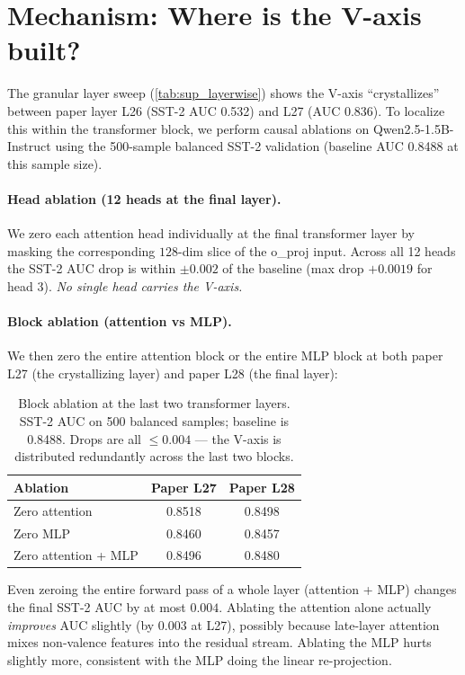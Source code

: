 \section{Mechanism: Where is the V-axis built?}
\label{sup:mechanism}

The granular layer sweep (\cref{tab:sup_layerwise}) shows the V-axis
``crystallizes'' between paper layer L26 (SST-2 AUC 0.532) and L27
(AUC 0.836). To localize this within the transformer block, we perform
causal ablations on Qwen2.5-1.5B-Instruct using the 500-sample balanced
SST-2 validation (baseline AUC 0.8488 at this sample size).

\paragraph{Head ablation (12 heads at the final layer).}
We zero each attention head individually at the final transformer layer
by masking the corresponding $128$-dim slice of the o\_proj input.
Across all 12 heads the SST-2 AUC drop is within $\pm 0.002$ of the
baseline (max drop $+0.0019$ for head 3). \emph{No single head carries
the V-axis.}

\paragraph{Block ablation (attention vs MLP).}
We then zero the entire attention block or the entire MLP block at
both paper L27 (the crystallizing layer) and paper L28 (the final
layer):

\begin{table}[h]
\centering
\caption{Block ablation at the last two transformer layers.
SST-2 AUC on 500 balanced samples; baseline is 0.8488. Drops are
all $\leq 0.004$ --- the V-axis is distributed redundantly across
the last two blocks.}
\label{tab:sup_block_ablation}
\begin{tabular}{lcc}
\toprule
Ablation & Paper L27 & Paper L28 \\
\midrule
Zero attention              & 0.8518 & 0.8498 \\
Zero MLP                    & 0.8460 & 0.8457 \\
Zero attention + MLP        & 0.8496 & 0.8480 \\
\bottomrule
\end{tabular}
\end{table}

Even zeroing the entire forward pass of a whole layer (attention + MLP)
changes the final SST-2 AUC by at most $0.004$. Ablating the attention
alone actually \emph{improves} AUC slightly (by 0.003 at L27), possibly
because late-layer attention mixes non-valence features into the residual
stream. Ablating the MLP hurts slightly more, consistent with the MLP
doing the linear re-projection.

